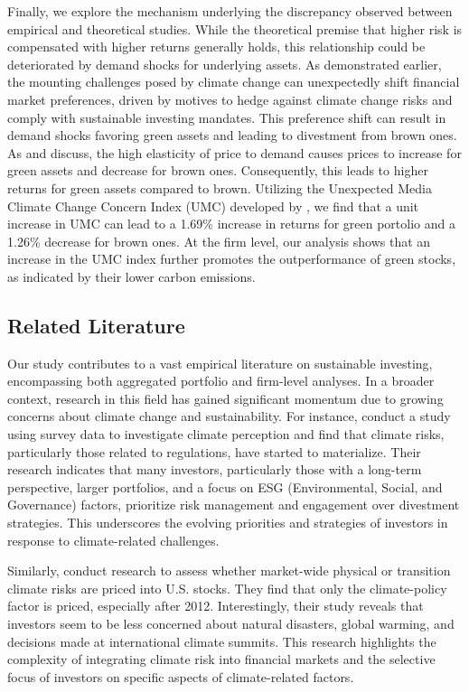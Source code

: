 \documentclass[12pt]{article}
\begin{document}
Finally, we explore the mechanism underlying the discrepancy observed between empirical and theoretical studies. While the theoretical premise that higher risk is compensated with higher returns generally holds, this relationship could be deteriorated by demand shocks for underlying assets. As demonstrated earlier, the mounting challenges posed by climate change can unexpectedly shift financial market preferences, driven by motives to hedge against climate change risks and comply with sustainable investing mandates. This preference shift can result in demand shocks favoring green assets and leading to divestment from brown ones. As \citet{gabaix2021search} and \citet{hartzmark2022predictable} discuss, the high elasticity of price to demand causes prices to increase for green assets and decrease for brown ones. Consequently, this leads to higher returns for green assets compared to brown. Utilizing the Unexpected Media Climate Change Concern Index (UMC) developed by \citet{ardia2022climate}, we find that a unit increase in UMC can lead to a 1.69\% increase in returns for green portolio and a 1.26\% decrease for brown ones. At the firm level, our analysis shows that an increase in the UMC index further promotes the outperformance of green stocks, as indicated by their lower carbon emissions.

\subsection*{Related Literature}

Our study contributes to a vast empirical literature on sustainable investing, encompassing both aggregated portfolio and firm-level analyses. In a broader context, research in this field has gained significant momentum due to growing concerns about climate change and sustainability. For instance, \cite{krueger2020importance} conduct a study using survey data to investigate climate perception and find that climate risks, particularly those related to regulations, have started to materialize. Their research indicates that many investors, particularly those with a long-term perspective, larger portfolios, and a focus on ESG (Environmental, Social, and Governance) factors, prioritize risk management and engagement over divestment strategies. This underscores the evolving priorities and strategies of investors in response to climate-related challenges. 

Similarly, \cite{faccini2023dissecting} conduct research to assess whether market-wide physical or transition climate risks are priced into U.S. stocks. They find that only the climate-policy factor is priced, especially after 2012. Interestingly, their study reveals that investors seem to be less concerned about natural disasters, global warming, and decisions made at international climate summits. This research highlights the complexity of integrating climate risk into financial markets and the selective focus of investors on specific aspects of climate-related factors. 
		
\end{document}

